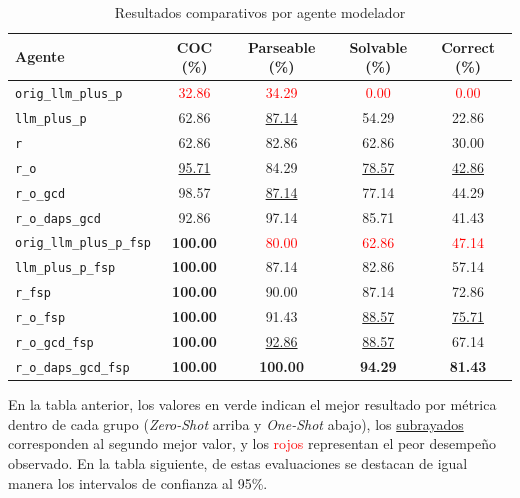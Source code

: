 \begin{table}[H]
\centering
\label{tab:resultados_agentes}
\begin{tabular}{lcccc}
\toprule
\textbf{Agente} & \textbf{COC (\%)} & \textbf{Parseable (\%)} & \textbf{Solvable (\%)} & \textbf{Correct (\%)} \\
\midrule
\texttt{orig\_llm\_plus\_p} & \textcolor{red}{32.86} & \textcolor{red}{34.29} & \textcolor{red}{0.00} & \textcolor{red}{0.00} \\
\texttt{llm\_plus\_p} & 62.86 & \underline{87.14} & 54.29 & 22.86 \\
\texttt{r} & 62.86 & 82.86 & 62.86 & 30.00 \\
\texttt{r\_o} & \underline{95.71} & 84.29 & \underline{78.57} & \underline{42.86} \\
\texttt{r\_o\_gcd} & \textcolor{green!60!black}{98.57} & \underline{87.14} & 77.14 & \textcolor{green!60!black}{44.29} \\
\texttt{r\_o\_daps\_gcd} & 92.86 & \textcolor{green!60!black}{97.14} & \textcolor{green!60!black}{85.71} & 41.43 \\
\midrule
\texttt{orig\_llm\_plus\_p\_fsp} & \textbf{\textcolor{green!60!black}{100.00}} & \textcolor{red}{80.00} & \textcolor{red}{62.86} & \textcolor{red}{47.14} \\
\texttt{llm\_plus\_p\_fsp} & \textbf{\textcolor{green!60!black}{100.00}} & 87.14 & 82.86 & 57.14 \\
\texttt{r\_fsp} & \textbf{\textcolor{green!60!black}{100.00}} & 90.00 & 87.14 & 72.86 \\
\texttt{r\_o\_fsp} & \textbf{\textcolor{green!60!black}{100.00}} & 91.43 & \underline{88.57} & \underline{75.71} \\
\texttt{r\_o\_gcd\_fsp} & \textbf{\textcolor{green!60!black}{100.00}} & \underline{92.86} & \underline{88.57} & 67.14 \\
\texttt{r\_o\_daps\_gcd\_fsp} & \textbf{\textcolor{green!60!black}{100.00}} & \textbf{\textcolor{green!60!black}{100.00}} & \textbf{\textcolor{green!60!black}{94.29}} & \textbf{\textcolor{green!60!black}{81.43}} \\
\bottomrule
\end{tabular}
\caption{Resultados comparativos por agente modelador}
\end{table}

En la tabla anterior, los valores en \textcolor{green!60!black}{verde} indican el mejor resultado por métrica dentro de cada grupo (\textit{Zero-Shot} arriba y \textit{One-Shot} abajo), los \underline{subrayados} corresponden al segundo mejor valor, y los \textcolor{red}{rojos} representan el peor desempeño observado. En la tabla siguiente, de estas evaluaciones se destacan de igual manera los intervalos de confianza al 95\%.

